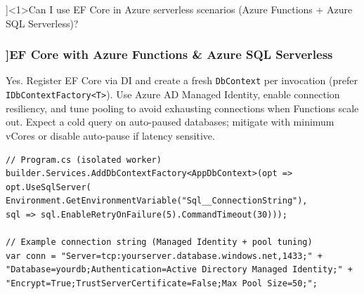 \QuestionSlide[\CategoryBadge[MicroColor!20]{Azure SQL}]<1>{Can I use EF Core in Azure serverless scenarios (Azure Functions + Azure SQL Serverless)?}

\begin{frame}[fragile]
\frametitle{\AnswerTitle[\CategoryBadge[MicroColor!20]{Azure SQL}]{EF Core with Azure Functions \& Azure SQL Serverless}}

{\footnotesize
Yes. Register EF Core via DI and create a fresh \texttt{DbContext} per invocation (prefer \texttt{IDbContextFactory<T>}). Use Azure AD Managed Identity, enable connection resiliency, and tune pooling to avoid exhausting connections when Functions scale out. Expect a cold query on auto-paused databases; mitigate with minimum vCores or disable auto-pause if latency sensitive.
}

\begin{verbatim}
// Program.cs (isolated worker)
builder.Services.AddDbContextFactory<AppDbContext>(opt =>
opt.UseSqlServer(
Environment.GetEnvironmentVariable("Sql__ConnectionString"),
sql => sql.EnableRetryOnFailure(5).CommandTimeout(30)));

// Example connection string (Managed Identity + pool tuning)
var conn = "Server=tcp:yourserver.database.windows.net,1433;" +
"Database=yourdb;Authentication=Active Directory Managed Identity;" +
"Encrypt=True;TrustServerCertificate=False;Max Pool Size=50;";
\end{verbatim}
\end{frame}